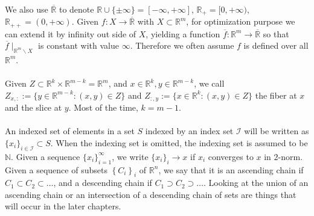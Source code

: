 \paragraph{}We also use $\overline{\mathbb{R}}$ to denote $\mathbb{R}\cup\{\pm\infty\}=[-\infty,+\infty]$, $\mathbb{R}_{+}=[0,+\infty)$, $\mathbb{R}_{++}=(0,+\infty)$. Given $f:X\to\overline{\mathbb{R}}$ with $X\subset \mathbb{R}^m$, for optimization purpose we can extend it by infinity out side of $X$, yielding a function $\overline{f}:\mathbb{R}^m\to\overline{\mathbb{R}}$ so that $\overline{f}\mid_{\mathbb{R}^m\smallsetminus X}$ is constant with value $\infty$. Therefore we often assume $f$ is defined over all $\mathbb{R}^m$.

\paragraph{}Given $Z\subset \mathbb{R}^{k}\times \mathbb{R}^{m-k}=\mathbb{R}^m$, and $x\in \mathbb{R}^k,y\in \mathbb{R}^{m-k}$, we call $Z_{x,:}:=\{y\in \mathbb{R}^{m-k}:(x,y)\in Z\}$ and $Z_{:,y}:=\{x\in \mathbb{R}^{k}:(x,y)\in Z\}$ the fiber at $x$ and the slice at $y$. Most of the time, $k=m-1$.

\paragraph{}An indexed set of elements in a set $S$ indexed by an index set $\mathcal{I}$ will be written as $\{x_i\}_{i\in \mathcal{I}}\subset S$. When the indexing set is omitted, the indexing set is assumed to be $\mathbb{N}$. Given a sequence $\{x_i\}_{i=1}^\infty$, we write $\{x_i\}_i\to x$ if $x_i$ converges to $x$ in $2$-norm. Given a sequence of subsets $\left\{C_i\right\}_{i}$ of $\mathbb{R}^n$, we say that it is an ascending chain if $C_1\subset C_2\subset \dotsc$, and a descending chain if $C_1\supset C_2\supset \dotsc$. Looking at the union of an ascending chain or an intersection of a descending chain of sets are things that will occur in the later chapters.


